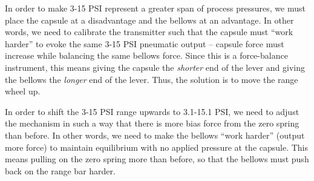 In order to make 3-15 PSI represent a greater span of process pressures, we must place the capsule at a disadvantage and the bellows at an advantage.  In other words, we need to calibrate the transmitter such that the capsule must ``work harder'' to evoke the same 3-15 PSI pneumatic output -- capsule force must increase while balancing the same bellows force.  Since this is a force-balance instrument, this means giving the capsule the {\it shorter} end of the lever and giving the bellows the {\it longer} end of the lever.  Thus, the solution is to move the range wheel up.

\vskip 10pt

In order to shift the 3-15 PSI range upwards to 3.1-15.1 PSI, we need to adjust the mechanism in such a way that there is more bias force from the zero spring than before.  In other words, we need to make the bellows ``work harder'' (output more force) to maintain equilibrium with no applied pressure at the capsule.  This means pulling on the zero spring more than before, so that the bellows must push back on the range bar harder.




